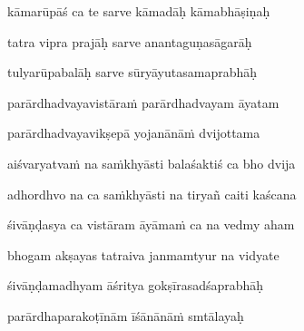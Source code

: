 kāmarūpāś ca te sarve kāmadāḥ kāmabhāṣiṇaḥ \veg\dontdisplaylinenum

tatra vipra prajāḥ sarve anantaguṇasāgarāḥ\thinspace{\dandab} \dontdisplaylinenum

tulyarūpabalāḥ sarve sūryāyutasamaprabhāḥ \veg\dontdisplaylinenum

parārdhadvayavistāra\.m parārdhadvayam āyatam\thinspace{\dandab} \dontdisplaylinenum

parārdhadvayavikṣepā yojanānā\.m dvijottama \veg\dontdisplaylinenum

aiśvaryatva\.m na sa\.mkhyāsti balaśaktiś ca bho dvija\thinspace{\dandab} \dontdisplaylinenum

adhordhvo na ca sa\.mkhyāsti na tiryañ caiti kaścana \veg\dontdisplaylinenum

śivāṇḍasya ca vistāram āyāma\.m ca na vedmy aham\thinspace{\dandab} \dontdisplaylinenum

bhogam akṣayas tatraiva janmamtyur na vidyate \veg\dontdisplaylinenum

śivāṇḍamadhyam āśritya gokṣīrasadśaprabhāḥ\thinspace{\dandab} \dontdisplaylinenum

parārdhaparakoṭīnām īśānānā\.m smtālayaḥ \veg\dontdisplaylinenum

